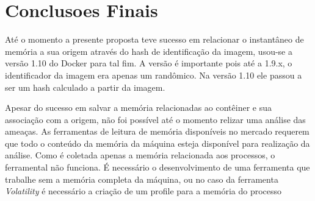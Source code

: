 \documentclass[conference]{IEEEtran}
\begin{document}
\section{Conclusoes Finais}
\label{sec:conclusion}

Até o momento a presente proposta teve sucesso em relacionar o instantâneo de memória a sua origem através do hash de identificação da imagem, usou-se a versão 1.10 do Docker para tal fim. 
%
A versão é importante pois até a 1.9.x, o identificador da imagem era apenas um randômico. Na versão 1.10 ele passou a ser um hash calculado a partir da imagem.

Apesar do sucesso em salvar a memória relacionadas ao contêiner e sua associação com a origem, não foi possível até o momento relizar uma análise das ameaças. 
%
As ferramentas de leitura de memória disponíveis no mercado requerem que todo o conteúdo da memória da máquina esteja disponível para realização da análise. 
%
Como é coletada apenas a memória relacionada aos processos, o ferramental não funciona. 
%
É necessário o desenvolvimento de uma ferramenta que trabalhe sem a memória completa da máquina, ou no caso da ferramenta \textit{Volatility} é necessário a criação de um profile para a memória do processo






\end{document}
